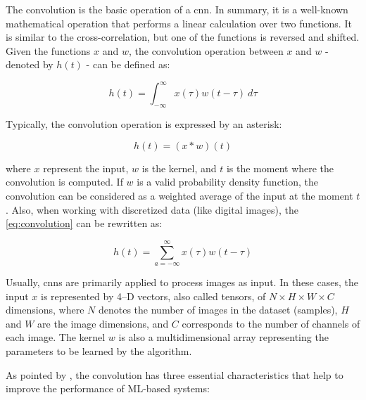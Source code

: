 The convolution is the basic operation of a \acs{cnn}. In summary, it is a well-known mathematical operation that performs a linear calculation over two functions. It is similar to the cross-correlation, but one of the functions is reversed and shifted. Given the functions $x$ and $w$, the convolution operation between $x$ and $w$ - denoted by $h(t)$ - can be defined as:

\begin{equation}
\label{eq:convolution}
h(t) = \int_{-\infty }^{\infty} x(\tau)w(t - \tau)\ d\tau
\end{equation}

\noindent
Typically, the convolution operation is expressed by an asterisk:

\begin{equation}
\label{eq:conv_ast}
h(t) = (x * w)(t)
\end{equation}

\noindent
where $x$ represent the input, $w$ is the kernel, and $t$ is the moment where the convolution is computed. If $w$ is a valid probability density function, the convolution can be considered as a weighted average of the input at the moment $t$. Also, when working with discretized data (like digital images), the \autoref{eq:convolution} can be rewritten as:

\begin{equation}
\label{eq:conv_discrete}
h(t) = \sum_{a=-\infty}^{\infty} x(\tau)w(t - \tau)
\end{equation}

Usually, \acsp{cnn} are primarily applied to process images as input. In these cases, the input $x$ is represented by 4--D vectors, also called tensors, of $N \times H \times W \times C$ dimensions, where $N$ denotes the number of images in the dataset (samples), $H$ and $W$ are the image dimensions, and $C$ corresponds to the number of channels of each image. The kernel $w$ is also a multidimensional array representing the parameters to be learned by the algorithm.

As pointed by \cite{goodfellow2016deep}, the convolution has three essential characteristics that help to improve the performance of ML-based systems:


